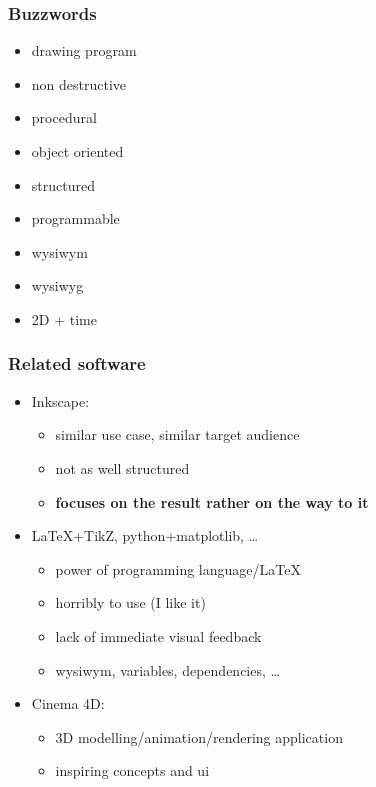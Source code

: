 \documentclass{beamer}
\begin{document}
  \begin{frame}[t]\frametitle{Buzzwords}
    \begin{itemize}
      \item drawing program
      \item non destructive
      \item procedural
      \item object oriented
      \item structured
      \item programmable
      \item wysiwym
      \item wysiwyg
      \item 2D + time
    \end{itemize}
  \end{frame}

  \begin{frame}[t]\frametitle{Related software}
    \begin{itemize}
      \item Inkscape: 
        \begin{itemize}
          \item similar use case, similar target audience
          \item not as well structured
          \item \textbf{focuses on the result rather on the way to it}
        \end{itemize}
      \item \LaTeX+TikZ, python+matplotlib, \dots
        \begin{itemize}
          \item power of programming language/\LaTeX
          \item horribly to use (I like it)
          \item lack of immediate visual feedback
          \item wysiwym, variables, dependencies, \dots
        \end{itemize}
      \item Cinema 4D:
        \begin{itemize}
          \item 3D modelling/animation/rendering application
          \item inspiring concepts and ui
        \end{itemize}
    \end{itemize}
  \end{frame}
\end{document}
